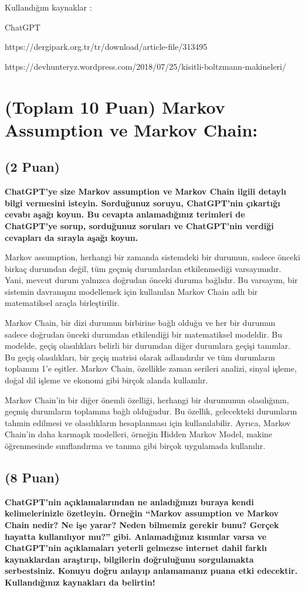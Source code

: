 \documentclass[11pt]{article}
\begin{document}
 Kullandığım kaynaklar : 
 
ChatGPT

https://dergipark.org.tr/tr/download/article-file/313495

https://devhunteryz.wordpress.com/2018/07/25/kisitli-boltzmann-makineleri/
 

\section{(Toplam 10 Puan) Markov Assumption ve Markov Chain:}

\subsection{(2 Puan)} \textbf{ChatGPT’ye size Markov assumption ve Markov Chain ilgili detaylı bilgi vermesini isteyin. Sorduğunuz soruyu, ChatGPT'nin çıkartığı cevabı aşağı koyun. Bu cevapta anlamadığınız terimleri de ChatGPT’ye sorup, sorduğunuz soruları ve ChatGPT’nin verdiği cevapları da sırayla aşağı koyun.}

Markov assumption, herhangi bir zamanda sistemdeki bir durumun, sadece önceki birkaç durumdan değil, tüm geçmiş durumlardan etkilenmediği varsayımıdır. Yani, mevcut durum yalnızca doğrudan önceki duruma bağlıdır. Bu varsayım, bir sistemin davranışını modellemek için kullanılan Markov Chain adlı bir matematiksel araçla birleştirilir.

Markov Chain, bir dizi durumun birbirine bağlı olduğu ve her bir durumun sadece doğrudan önceki durumdan etkilendiği bir matematiksel modeldir. Bu modelde, geçiş olasılıkları belirli bir durumdan diğer durumlara geçişi tanımlar. Bu geçiş olasılıkları, bir geçiş matrisi olarak adlandırılır ve tüm durumların toplamını 1'e eşitler. Markov Chain, özellikle zaman serileri analizi, sinyal işleme, doğal dil işleme ve ekonomi gibi birçok alanda kullanılır.

Markov Chain'in bir diğer önemli özelliği, herhangi bir durumunun olasılığının, geçmiş durumların toplamına bağlı olduğudur. Bu özellik, gelecekteki durumların tahmin edilmesi ve olasılıkların hesaplanması için kullanılabilir. Ayrıca, Markov Chain'in daha karmaşık modelleri, örneğin Hidden Markov Model, makine öğrenmesinde sınıflandırma ve tanıma gibi birçok uygulamada kullanılır.

\subsection{(8 Puan)} \textbf{ChatGPT’nin açıklamalarından ne anladığınızı buraya kendi kelimelerinizle özetleyin. Örneğin ``Markov assumption ve Markov Chain nedir? Ne işe yarar? Neden bilmemiz gerekir bunu? Gerçek hayatta kullanılıyor mu?'' gibi. Anlamadığınız kısımlar varsa ve ChatGPT’nin açıklamaları yeterli gelmezse internet dahil farklı kaynaklardan araştırıp, bilgilerin doğruluğunu sorgulamakta serbestsiniz. Konuyu doğru anlayıp anlamamanız puana etki edecektir. Kullandığınız kaynakları da belirtin!}
\end{document}
